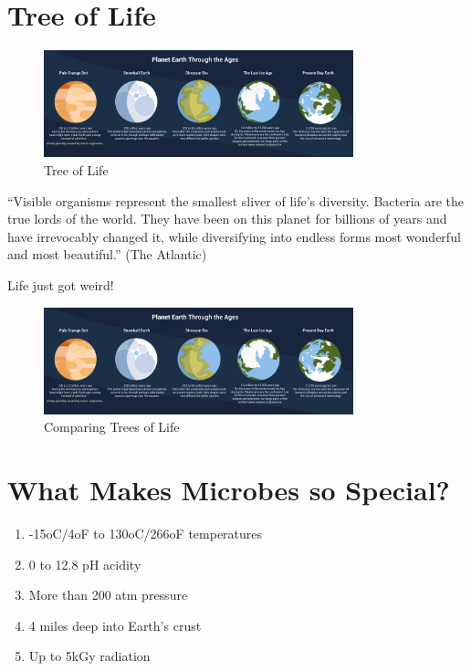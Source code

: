 \documentclass[
]{book}
\providecommand{\tightlist}{%
  \setlength{\itemsep}{0pt}\setlength{\parskip}{0pt}}
\begin{document}
\hypertarget{tree-of-life}{%
\section{Tree of Life}\label{tree-of-life}}

\begin{figure}
\centering
\includegraphics[width=0.8\textwidth,height=\textheight]{./Figures/Planets.png}
\caption{Tree of Life}
\end{figure}

``Visible organisms represent the smallest sliver of life's diversity. Bacteria are the true lords of the world. They have been on this planet for billions of years and have irrevocably changed it, while diversifying into endless forms most wonderful and most beautiful.'' (The Atlantic)

Life just got weird!

\begin{figure}
\centering
\includegraphics[width=0.8\textwidth,height=\textheight]{./Figures/Planets.png}
\caption{Comparing Trees of Life}
\end{figure}

\hypertarget{what-makes-microbes-so-special}{%
\section{What Makes Microbes so Special?}\label{what-makes-microbes-so-special}}

\begin{enumerate}
\def\labelenumi{\arabic{enumi}.}
\tightlist
\item
  -15oC/4oF to 130oC/266oF temperatures
\item
  0 to 12.8 pH acidity
\item
  More than 200 atm pressure
\item
  4 miles deep into Earth's crust
\item
  Up to 5kGy radiation
\end{enumerate}
\end{document}
